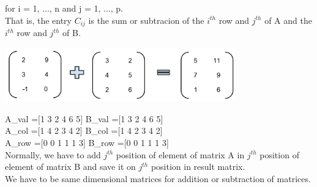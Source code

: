 for i = 1, ..., n and j = 1, ..., p.\\
That is, the entry $C_{ij}$ is the sum or subtracion of the $i^{th}$ row and $j^{th}$ of A and the $i^{th}$ row and $j^{th}$ of B.\\
\begin{center}
	\includegraphics[width=10cm]{Chapters/matrix-matrix-addition} 
\end{center}
	A\_val =[1 3 2 4 6 5] \quad     B\_val =[1 3 2 4 6 5]\\
	A\_col =[1 4 2 3 4 2]  \quad    B\_col =[1 4 2 3 4 2]\\
	A\_row =[0 0 1 1 1 3]  \quad    B\_row =[0 0 1 1 1 3]\\
	Normally, we have to add $j^{th}$ position of element of matrix A in $j^{th}$ position of element of matrix B and save it on $j^{th}$ position in result matrix.\\
	We have to be same dimensional matrices for addition or subtraction of matrices.
